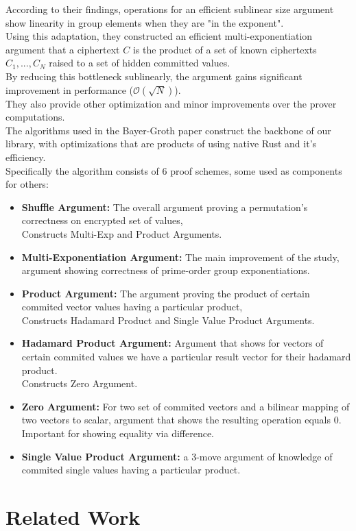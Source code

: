 \documentclass[12pt,a4paper]{report}
\begin{document}
According to their findings, operations for an efficient sublinear size argument
show linearity in group elements when they are "in the exponent". \\
Using this adaptation, they constructed an efficient multi-exponentiation argument that a ciphertext
$C$ is the product of a set of known ciphertexts $C_1,...,C_N$ raised to a set of
hidden committed values. \\ 
By reducing this bottleneck sublinearly, the argument 
gains significant improvement in performance ($\mathcal{O}(\sqrt{N})$).\\
They also provide other optimization and minor improvements over the prover computations.\\
The algorithms used in the Bayer-Groth paper construct the backbone of our library,
with optimizations that are products of using native Rust and it's efficiency.\\
Specifically the algorithm consists of 6 proof schemes, some used as components for others:
\begin{itemize}
	\item \textbf{Shuffle Argument:} The overall argument proving a permutation's correctness on encrypted set of values,\\Constructs Multi-Exp and Product Arguments.
	\item \textbf{Multi-Exponentiation Argument:} The main improvement of the study, argument showing correctness of prime-order group exponentiations.
	\item \textbf{Product Argument:} The argument proving the product of certain commited vector values having a particular product,\\Constructs Hadamard Product and Single Value Product Arguments.
	\item \textbf{Hadamard Product Argument:} Argument that shows for vectors of certain commited values we have a particular result vector for their hadamard product.\\Constructs Zero Argument.
	\item \textbf{Zero Argument:} For two set of commited vectors and a bilinear mapping of two vectors to scalar, argument that shows the resulting operation equals $0$. Important for showing equality via difference.
	\item \textbf{Single Value Product Argument:} a 3-move argument of knowledge of commited single values having a particular product.
\end{itemize}

\section{Related Work}
\end{document}
